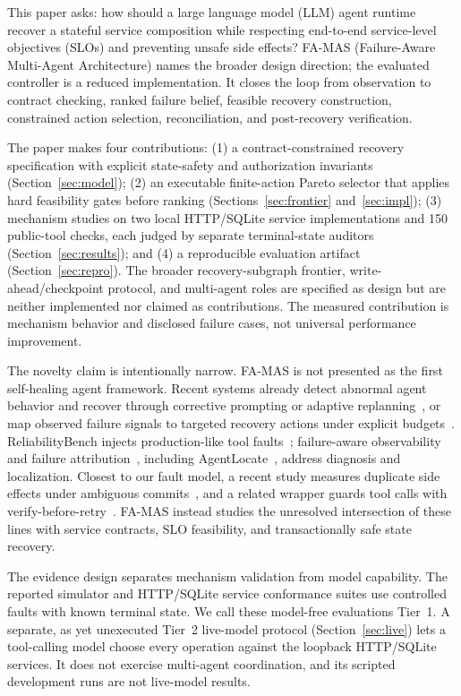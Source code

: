 \documentclass[10pt,journal,compsoc]{IEEEtran}
\newcommand{\famas}{FA-MAS}
\begin{document}
This paper asks: how should a large language model (LLM) agent runtime recover a stateful service composition while respecting end-to-end service-level objectives (SLOs) and preventing unsafe side effects? \famas{} (Failure-Aware Multi-Agent Architecture) names the broader design direction; the evaluated controller is a reduced implementation. It closes the loop from observation to contract checking, ranked failure belief, feasible recovery construction, constrained action selection, reconciliation, and post-recovery verification.

The paper makes four contributions: (1) a contract-constrained recovery specification with explicit state-safety and authorization invariants (Section~\ref{sec:model}); (2) an executable finite-action Pareto selector that applies hard feasibility gates before ranking (Sections~\ref{sec:frontier} and~\ref{sec:impl}); (3) mechanism studies on two local HTTP/SQLite service implementations and 150 public-tool checks, each judged by separate terminal-state auditors (Section~\ref{sec:results}); and (4) a reproducible evaluation artifact (Section~\ref{sec:repro}). The broader recovery-subgraph frontier, write-ahead/checkpoint protocol, and multi-agent roles are specified as design but are neither implemented nor claimed as contributions. The measured contribution is mechanism behavior and disclosed failure cases, not universal performance improvement.

The novelty claim is intentionally narrow. \famas{} is not presented as the first self-healing agent framework. Recent systems already detect abnormal agent behavior and recover through corrective prompting or adaptive replanning~\cite{jeong2026selfhealing}, or map observed failure signals to targeted recovery actions under explicit budgets~\cite{babu2026selfhealing}. ReliabilityBench injects production-like tool faults~\cite{gupta2026reliabilitybench}; failure-aware observability~\cite{li2026wasted} and failure attribution~\cite{zhang2025whichagent}, including AgentLocate~\cite{xia2026agentlocate}, address diagnosis and localization. Closest to our fault model, a recent study measures duplicate side effects under ambiguous commits~\cite{li2026exactlyonce}, and a related wrapper guards tool calls with verify-before-retry~\cite{mansoor2026verified}. \famas{} instead studies the unresolved intersection of these lines with service contracts, SLO feasibility, and transactionally safe state recovery.

The evidence design separates mechanism validation from model capability. The reported simulator and HTTP/SQLite service conformance suites use controlled faults with known terminal state. We call these model-free evaluations Tier~1. A separate, as yet unexecuted Tier~2 live-model protocol (Section~\ref{sec:live}) lets a tool-calling model choose every operation against the loopback HTTP/SQLite services. It does not exercise multi-agent coordination, and its scripted development runs are not live-model results.
\end{document}
